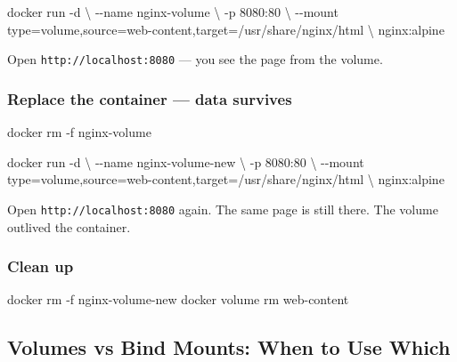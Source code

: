 \documentclass[11pt,american,a4paper,openany]{book}
\newenvironment{Shaded}{}{}
\newcommand{\NormalTok}[1]{#1}
\begin{document}
\begin{Shaded}
\begin{Highlighting}[]
\NormalTok{docker run {-}d \textbackslash{}}
\NormalTok{  {-}{-}name nginx{-}volume \textbackslash{}}
\NormalTok{  {-}p 8080:80 \textbackslash{}}
\NormalTok{  {-}{-}mount type=volume,source=web{-}content,target=/usr/share/nginx/html \textbackslash{}}
\NormalTok{  nginx:alpine}
\end{Highlighting}
\end{Shaded}

Open \texttt{http://localhost:8080} --- you see the page from the
volume.

\subsubsection{Replace the container --- data
survives}\label{replace-the-container-data-survives}

\begin{Shaded}
\begin{Highlighting}[]
\NormalTok{docker rm {-}f nginx{-}volume}

\NormalTok{docker run {-}d \textbackslash{}}
\NormalTok{  {-}{-}name nginx{-}volume{-}new \textbackslash{}}
\NormalTok{  {-}p 8080:80 \textbackslash{}}
\NormalTok{  {-}{-}mount type=volume,source=web{-}content,target=/usr/share/nginx/html \textbackslash{}}
\NormalTok{  nginx:alpine}
\end{Highlighting}
\end{Shaded}

Open \texttt{http://localhost:8080} again. The same page is still there.
The volume outlived the container.

\subsubsection{Clean up}\label{clean-up-1}

\begin{Shaded}
\begin{Highlighting}[]
\NormalTok{docker rm {-}f nginx{-}volume{-}new}
\NormalTok{docker volume rm web{-}content}
\end{Highlighting}
\end{Shaded}

\subsection{Volumes vs Bind Mounts: When to Use
Which}\label{volumes-vs-bind-mounts-when-to-use-which}
\end{document}
